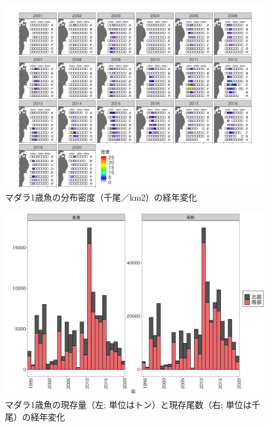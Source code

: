 \documentclass[11pt]{article} %
\begin{document}
\begin{linenumbers}
\begin{figure}[h]
  \centering
  \includegraphics[width = 14cm]{マダラ１＋dens.png}
  \caption{マダラ1歳魚の分布密度（千尾／km2）の経年変化}
\end{figure}

\begin{figure}[h]
  \centering
  \includegraphics[width = 14cm]{マダラ１＋trend.png}
  \caption{マダラ1歳魚の現存量（左; 単位はトン）と現存尾数（右; 単位は千尾）の経年変化}
\end{figure}


\end{linenumbers}
\end{document}
